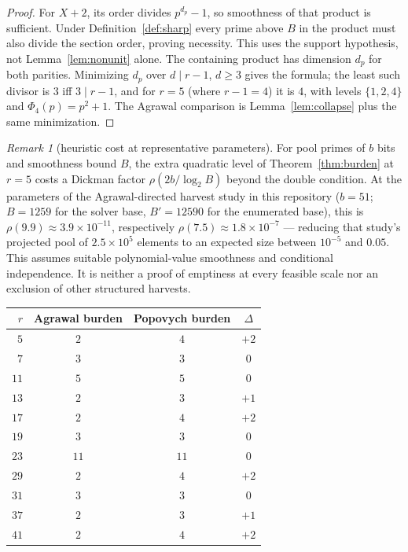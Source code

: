 \documentclass[11pt]{article}
\theoremstyle{remark}
\newtheorem{remark}[theorem]{Remark}
\begin{document}
\begin{proof}
For $X+2$, its order divides $p^{d_p}-1$, so smoothness of that product
is sufficient. Under Definition~\ref{def:sharp} every prime above $B$
in the product must also divide the section order, proving necessity.
This uses the support hypothesis, not Lemma~\ref{lem:nonunit} alone.
The containing product has dimension $d_p$ for both parities.
Minimizing $d_p$ over
$d \mid r - 1$, $d \ge 3$ gives the formula; the least such divisor is
$3$ iff $3 \mid r - 1$, and for $r = 5$ (where $r - 1 = 4$) it is $4$,
with levels $\{1, 2, 4\}$ and $\Phi_4(p) = p^2 + 1$. The Agrawal
comparison is Lemma~\ref{lem:collapse} plus the same minimization.
\end{proof}

\begin{remark}[heuristic cost at representative parameters]\label{cor:cost}
For pool primes of $b$ bits and smoothness bound $B$, the extra
quadratic level of Theorem~\ref{thm:burden} at $r = 5$ costs a Dickman
factor $\rho(2b / \log_2 B)$ beyond the double condition. At the
parameters of the Agrawal-directed harvest study in this repository
($b = 51$; $B = 1259$ for the solver base, $B' = 12590$ for the
enumerated base), this is $\rho(9.9) \approx 3.9\times10^{-11}$,
respectively $\rho(7.5) \approx 1.8\times10^{-7}$ --- reducing that
study's projected pool of $2.5\times10^5$ elements to an expected size
between $10^{-5}$ and $0.05$. This assumes suitable polynomial-value
smoothness and conditional independence. It is neither a proof of emptiness
at every feasible scale nor an exclusion of other structured harvests.
\end{remark}

\begin{center}
\begin{tabular}{@{}rccc@{}}
\toprule
$r$ & Agrawal burden & Popovych burden & $\Delta$ \\
\midrule
$5$ & $2$ & $4$ & $+2$ \\
$7$ & $3$ & $3$ & $0$ \\
$11$ & $5$ & $5$ & $0$ \\
$13$ & $2$ & $3$ & $+1$ \\
$17$ & $2$ & $4$ & $+2$ \\
$19$ & $3$ & $3$ & $0$ \\
$23$ & $11$ & $11$ & $0$ \\
$29$ & $2$ & $4$ & $+2$ \\
$31$ & $3$ & $3$ & $0$ \\
$37$ & $2$ & $3$ & $+1$ \\
$41$ & $2$ & $4$ & $+2$ \\
\bottomrule
\end{tabular}
\end{center}
\end{document}
